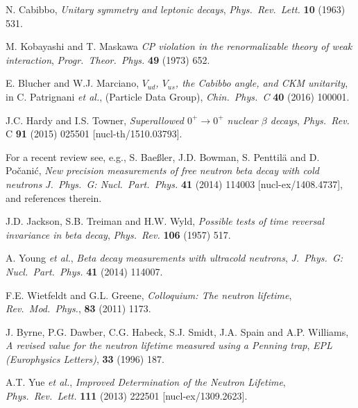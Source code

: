 \documentclass{PoS}
\newcommand{\etal}{\textsl{et al.}}
\newcommand{\PR}{Phys.\ Rev.}
\newcommand{\PRL}{Phys.\ Rev.\ Lett.}
\newcommand{\PTP}{Progr.\ Theor.\ Phys.}
\begin{document}
\begin{thebibliography}{99}

 N. Cabibbo, \emph{Unitary symmetry and leptonic decays},
  \emph{\PRL} \textbf{10} (1963) 531.

 M. Kobayashi and T. Maskawa \emph{CP violation in the
  renormalizable theory of weak interaction}, \emph{\PTP} \textbf{49}
  (1973) 652.

 E. Blucher and W.J. Marciano, \emph{$V_{ud}$, $V_{us}$,
  the Cabibbo angle, and CKM unitarity}, in C. Patrignani \etal,
  (Particle Data Group), \emph{Chin.\ Phys.\ C} \textbf{40} (2016) 100001.

 J.C. Hardy and I.S. Towner, \emph{Superallowed $0^+ \to
  0^+$ nuclear $\beta$ decays}, \emph{\PR} C \textbf{91} (2015) 025501
  [nucl-th/1510.03793]. 

 For a recent review see, e.g., S. Bae{\ss}ler,
  J.D. Bowman, S. Penttil\"a and D. Po\v{c}ani\'c, \emph{New precision
    measurements of free neutron beta decay with cold neutrons}
  \emph{J.\ Phys.\ G: Nucl.\ Part.\ Phys.} \textbf{41} (2014) 114003
       [nucl-ex/1408.4737], and references therein.

 J.D. Jackson, S.B. Treiman and H.W. Wyld, \emph{Possible
  tests of time reversal invariance in beta decay}, \emph{\PR}
  \textbf{106} (1957) 517.


 A. Young \etal, \emph{Beta decay measurements with
  ultracold neutrons}, \emph{J.\ Phys.\ G: Nucl.\ Part.\ Phys.}
  \textbf{41} (2014) 114007.

  F.E. Wietfeldt and G.L. Greene, \emph{Colloquium: The
  neutron lifetime}, \emph{Rev.\ Mod.\ Phys.}, \textbf {83} (2011) 1173.

 J. Byrne, P.G. Dawber, C.G. Habeck, S.J. Smidt,
  J.A. Spain and A.P. Williams, \emph{A revised value for the neutron
    lifetime measured using a Penning trap}, \emph{EPL (Europhysics Letters)},
    \textbf{33} (1996) 187.

  

 A.T. Yue \etal,
  \emph{Improved Determination of the Neutron Lifetime}, \emph{\PRL}
  \textbf{111} (2013) 222501 [nucl-ex/1309.2623].
  

\end{thebibliography}
\end{document}
